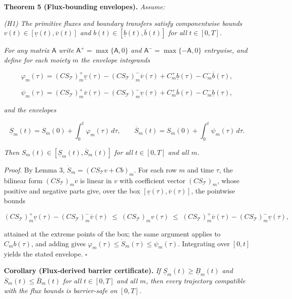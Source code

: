 \documentclass[11pt]{article}
\begin{document}
\textbf{Theorem 5 (Flux-bounding envelopes).} \emph{Assume:}

\emph{(H1) The primitive fluxes and boundary transfers satisfy componentwise bounds \(v(t) \in [\underline{v}(t),\allowbreak{} \overline{v}(t)]\) and \(b(t) \in [\underline{b}(t),\allowbreak{} \overline{b}(t)]\) for all \(t \in [0,T]\).}

\emph{For any matrix \(\mathsf{A}\) write \(\mathsf{A}^{+\allowbreak{}} =\allowbreak{} \max\{\mathsf{A},\allowbreak{} 0\}\) and \(\mathsf{A}^{-} =\allowbreak{} \max\{-\mathsf{A},\allowbreak{} 0\}\) entrywise, and define for each moiety \(m\) the envelope integrands} 

$$\varphi_m(\tau) = (C S_{\mathcal{T}})_{m}^{+} \underline{v}(\tau) - (C S_{\mathcal{T}})_{m}^{-} \overline{v}(\tau) + C_{m}^{+} \underline{b}(\tau) - C_{m}^{-} \overline{b}(\tau),$$

 

$$\psi_m(\tau) = (C S_{\mathcal{T}})_{m}^{+} \overline{v}(\tau) - (C S_{\mathcal{T}})_{m}^{-} \underline{v}(\tau) + C_{m}^{+} \overline{b}(\tau) - C_{m}^{-} \underline{b}(\tau),$$

 \emph{and the envelopes} 

$$\underline{S}_m(t) = S_m(0) + \int_0^t \varphi_m(\tau)\, d\tau, \qquad \overline{S}_m(t) = S_m(0) + \int_0^t \psi_m(\tau)\, d\tau.$$

 \emph{Then \(S_m(t) \in [\underline{S}_m(t),\allowbreak{} \overline{S}_m(t)]\) for all \(t \in [0,T]\) and all \(m\).}

\emph{Proof.} By Lemma 3, \(\dot S_m =\allowbreak{} (C S_{\mathcal{T}} v +\allowbreak{} Cb)_m\). For each row \(m\) and time \(\tau\), the bilinear form \((C S_{\mathcal{T}})_m v\) is linear in \(v\) with coefficient vector \((C S_{\mathcal{T}})_m\), whose positive and negative parts give, over the box \([\underline{v}(\tau),\allowbreak{} \overline{v}(\tau)]\), the pointwise bounds 

$$(C S_{\mathcal{T}})_{m}^{+} \underline{v}(\tau) - (C S_{\mathcal{T}})_{m}^{-} \overline{v}(\tau) \;\le\; (C S_{\mathcal{T}})_m v(\tau) \;\le\; (C S_{\mathcal{T}})_{m}^{+} \overline{v}(\tau) - (C S_{\mathcal{T}})_{m}^{-} \underline{v}(\tau),$$

 attained at the extreme points of the box; the same argument applies to \(C_m b(\tau)\), and adding gives \(\varphi_m(\tau) \le \dot S_m(\tau) \le \psi_m(\tau)\). Integrating over \([0,t]\) yields the stated envelope. \(\square\)

\textbf{Corollary (Flux-derived barrier certificate).} \emph{If \(\underline{S}_m(t) \ge \underline{B}_m(t)\) and \(\overline{S}_m(t) \le \overline{B}_m(t)\) for all \(t \in [0,T]\) and all \(m\), then every trajectory compatible with the flux bounds is barrier-safe on \([0,T]\).}
\end{document}
